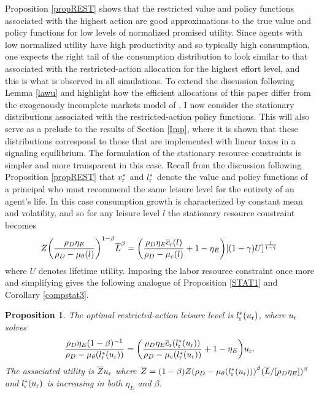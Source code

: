 \documentclass[11pt]{article}
\theoremstyle{plain}
\newtheorem{prop}[thm]{Proposition}
\begin{document}
Proposition \ref{propREST} shows that the restricted value and policy functions associated with the highest action are good approximations to the true value and policy functions for low levels of normalized promised utility. Since agents with low normalized utility have high productivity and so typically high consumption, one expects the right tail of the consumption distribution to look similar to that associated with the restricted-action allocation for the highest effort level, and this is what is observed in all simulations. To extend the discussion following Lemma \ref{lawu} and highlight how the efficient allocations of this paper differ from the exogenously incomplete markets model of \cite{jones_schumpeterian_2018}, I now consider the stationary distributions associated with the restricted-action policy functions. This will also serve as a prelude to the results of Section \ref{Imp}, where it is shown that these distributions correspond to those that are implemented with linear taxes in a signaling equilibrium. The formulation of the stationary resource constraints is simpler and more transparent in this case. Recall from the discussion following Proposition \ref{propREST} that $v^*_{\textnormal{r}}$ and $l_{\textnormal{r}}^*$ denote the value and policy functions of a principal who must recommend the same leisure level for the entirety of an agent's life. In this case consumption growth is characterized by constant mean and volatility, and so for any leisure level $l$ the stationary resource constraint becomes
$$
Z{\left(\frac{\rho_D\eta_E}{\rho_D - \mu_{\theta}(l)} \right)}^{1-\beta}\overline{L}^{\beta} = {\left(\frac{\rho_D \eta_E\overline{c}_{\textnormal{r}}(l)}{\rho_D - \mu_c(l)} + 1 - \eta_E\right)}[(1-\gamma)U]^{\frac{1}{1-\overline{\gamma}}}
$$
where $U$ denotes lifetime utility. Imposing the labor resource constraint once more and simplifying gives the following analogue of Proposition \ref{STAT1} and Corollary \ref{compstat3}.

\begin{prop}\label{RESTchar}
The optimal restricted-action leisure level is $l_{\textnormal{r}}^*(u_{\textnormal{r}})$, where $u_{\textnormal{r}}$ solves 
$$
\frac{\rho_D \eta_E (1-\beta)^{-1}}{\rho_D - \mu_{\theta}(l_{\textnormal{r}}^*(u_{\textnormal{r}}))} = {\left(\frac{\rho_D \eta_E\overline{c}_{\textnormal{r}}(l_{\textnormal{r}}^*(u_{\textnormal{r}}))}{\rho_D - \mu_c(l_{\textnormal{r}}^*(u_{\textnormal{r}}))} + 1 - \eta_E\right)}u_{\textnormal{r}}.
$$
The associated utility is $\overline{Z}u_{\textnormal{r}}$ where $\overline{Z} = (1-\beta)Z{\left(\rho_D - \mu_{\theta}(l_{\textnormal{r}}^*(u_{\textnormal{r}}))\right)}^{\beta}(\overline{L}/[\rho_D\eta_E])^{\beta}$ and $l_{\textnormal{r}}^*(u_{\textnormal{r}})$ is increasing in both $\eta_E$ and $\beta$.
\end{prop} %
\end{document}
